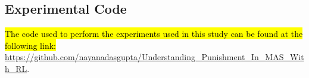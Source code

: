 \documentclass[sn-aps,numbered]{sn-jnl}%
\theoremstyle{thmstyleone}%
\theoremstyle{thmstyletwo}%
\theoremstyle{thmstylethree}%
\begin{document}
\begin{appendices}
\clearpage
\section{Experimental Code}

\hl{The code used to perform the experiments used in this study can be found at the following link:} \url{https://github.com/nayanadasgupta/Understanding_Punishment_In_MAS_With_RL}.




\end{appendices}



\end{document}
